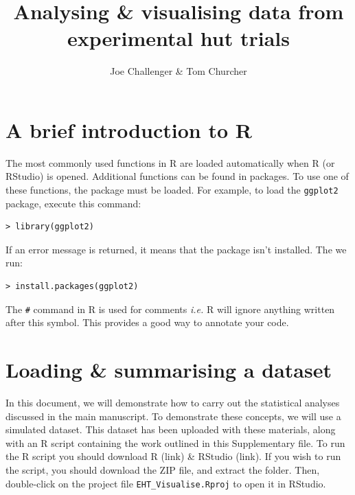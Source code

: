 \documentclass[11pt]{article}
\title{Analysing \& visualising data from experimental hut trials}
\author{Joe Challenger \& Tom Churcher}
\begin{document}
\maketitle

\section*{A brief introduction to R}

The most commonly used functions in R are loaded automatically when R (or RStudio) is opened. Additional functions can be found in packages. To use one of these functions, the package must be loaded. For example, to load the \verb+ggplot2+ package, execute this command:

\begin{verbatim}
> library(ggplot2)

\end{verbatim}
If an error message is returned, it means that the package isn't installed. The we run:

\begin{verbatim}
> install.packages(ggplot2)
\end{verbatim}

The \verb+#+ command in R is used for comments \textit{i.e.} R will ignore anything written after this symbol. This provides a good way to annotate your code.


\section{Loading \& summarising a dataset}

In this document, we will demonstrate how to carry out the statistical analyses discussed in the main manuscript. To demonstrate these concepts, we will use a simulated dataset. This dataset has been uploaded with these materials, along with an R script containing the work outlined in this Supplementary file. To run the R script you should download R (link) \& RStudio (link). If you wish to run the script, you should download the ZIP file, and extract the folder. Then, double-click on the project file \verb+EHT_Visualise.Rproj+ to open it in RStudio.
\end{document}
